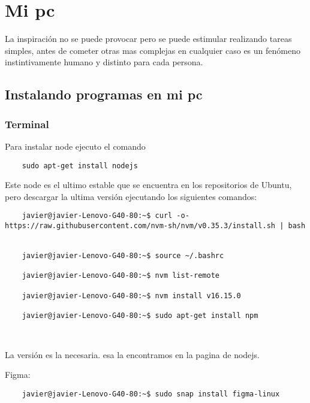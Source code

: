\part{Mi pc}

La inspiraci\'on no se puede provocar pero se puede estimular realizando tareas simples, antes de cometer otras mas complejas en cualquier caso es un fen\'omeno instintivamente humano y distinto para cada persona.
\chapter{Instalando programas en mi pc}
\section{Terminal}
Para instalar node ejecuto el comando 
\begin{verbatim}
	sudo apt-get install nodejs
\end{verbatim}
Este node es el ultimo estable que se encuentra en los repositorios de Ubuntu, pero descargar la ultima versi\'on ejecutando los siguientes comandos:

\begin{verbatim}
	javier@javier-Lenovo-G40-80:~$ curl -o- https://raw.githubusercontent.com/nvm-sh/nvm/v0.35.3/install.sh | bash
	
	
	javier@javier-Lenovo-G40-80:~$ source ~/.bashrc
	
	javier@javier-Lenovo-G40-80:~$ nvm list-remote
	
	javier@javier-Lenovo-G40-80:~$ nvm install v16.15.0
	
	javier@javier-Lenovo-G40-80:~$ sudo apt-get install npm
	
	
\end{verbatim}

La versi\'on es la necesaria. esa la encontramos en la pagina de nodejs.

Figma: 
\begin{verbatim}
	javier@javier-Lenovo-G40-80:~$ sudo snap install figma-linux
\end{verbatim}

